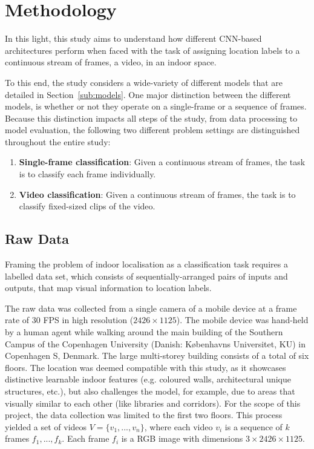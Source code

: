 \documentclass[a4paper]{article}
\begin{document}
\section{Methodology} %
\label{sec:methodology}

In this light, this study aims to understand how different CNN-based
architectures perform when faced with the task of assigning location labels to a
continuous stream of frames, a video, in an indoor space. 

To this end, the study considers a wide-variety of different models that are
detailed in Section~\ref{sub:models}. One major distinction between the
different models, is whether or not they operate on a single-frame or a sequence
of frames. Because this distinction impacts all steps of the study, from data
processing to model evaluation, the following two different problem settings are
distinguished throughout the entire study:

\begin{enumerate}

\item \textbf{Single-frame classification}: Given a continuous stream of frames,
  the task is to classify each frame individually.

\item \textbf{Video classification}: Given a continuous stream of frames, the
  task is to classify fixed-sized clips of the video.

\end{enumerate}

\subsection{Raw Data} %
\label{sub:raw-data}

Framing the problem of indoor localisation as a classification task requires a
labelled data set, which consists of sequentially-arranged pairs of inputs and
outputs, that map visual information to location labels. 

The raw data was collected from a single camera of a mobile device at a frame
rate of 30 FPS in high resolution ($2426\times 1125$). The mobile device was
hand-held by a human agent while walking around the main building of the
Southern Campus of the Copenhagen University (Danish: K\o{}benhavns Universitet,
KU) in Copenhagen S, Denmark. The large multi-storey building consists of a
total of six floors. The location was deemed compatible with this study, as it
showcases distinctive learnable indoor features (e.g. coloured walls,
architectural unique structures, etc.), but also challenges the model, for
example, due to areas that visually similar to each other (like libraries and
corridors). For the scope of this project, the data collection was limited to
the first two floors. This process yielded a set of videos $V = \{v_1, ...,
v_n\}$, where each video $v_i$ is a sequence of $k$ frames $f_1, ..., f_k$. Each
frame $f_i$ is a RGB image with dimensions $3 \times 2426 \times 1125$.
\end{document}
